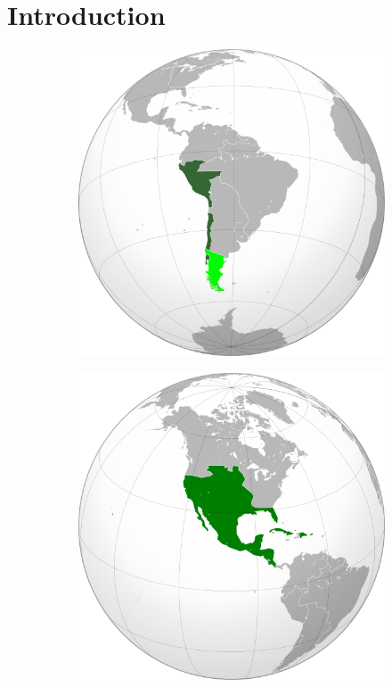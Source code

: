 \documentclass[12pt]{article}
\begin{document}
\maketitle

\small

\section{Introduction}

\begin{figure}[ht]
\centering
\begin{subfigure}{0.125\textwidth}
\includegraphics[width=\textwidth]{vice_peru.png}
\caption{\label{fig:1a}}
\end{subfigure}
\begin{subfigure}{0.125\textwidth}
\includegraphics[width=\textwidth]{vice_nuevaespana.png}

\end{subfigure}
\end{figure}
\end{document}
